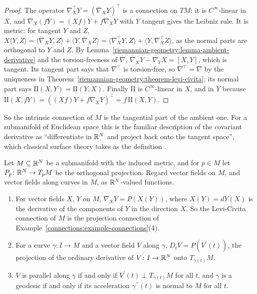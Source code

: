 \begin{proof}
The operator $\nabla^\top_XY = (\overline{\nabla}_XY)^\top$ is a connection on $TM$: it is $C^\infty$-linear in $X$, and
$\overline{\nabla}_X(fY) = (Xf)Y + f\overline{\nabla}_XY$ with $Y$ tangent gives the Leibniz rule. It is metric: for tangent $Y$ and $Z$,
$X\langle Y, Z\rangle = \langle\overline{\nabla}_XY, Z\rangle + \langle Y, \overline{\nabla}_XZ\rangle = \langle\nabla^\top_XY, Z\rangle + \langle Y, \nabla^\top_XZ\rangle$, as the normal parts are orthogonal to
$Y$ and $Z$. By Lemma~\ref{riemannian-geometry:lemma-ambient-derivative} and the torsion-freeness of $\overline{\nabla}$,
$\overline{\nabla}_XY - \overline{\nabla}_YX = [X, Y]$, which is tangent. Its tangent part says that $\nabla^\top$ is torsion-free, so $\nabla^\top = \nabla$ by the uniqueness in
Theorem~\ref{riemannian-geometry:theorem-levi-civita}; its normal part says $\mathrm{II}(X, Y) = \mathrm{II}(Y, X)$. Finally $\mathrm{II}$ is $C^\infty$-linear in $X$, and in $Y$
because $\mathrm{II}(X, fY) = ((Xf)Y + f\overline{\nabla}_XY)^\perp = f\,\mathrm{II}(X, Y)$.
\end{proof}

So the intrinsic connection of $M$ is the tangential part of the ambient one. For a submanifold of Euclidean space this is the familiar description of the covariant derivative as
``differentiate in $\mathbb{R}^N$ and project back onto the tangent space'', which classical surface theory takes as the definition \cite[Chapter 4]{do-carmo-curves-surfaces}.

\begin{corollary}\label{riemannian-geometry:corollary-tangential-projection}
Let $M \subseteq \mathbb{R}^N$ be a submanifold with the induced metric, and for $p \in M$ let $P_p \colon \mathbb{R}^N \to T_pM$ be the orthogonal projection. Regard vector fields on $M$, and vector fields along
curves in $M$, as $\mathbb{R}^N$-valued functions.
\begin{enumerate}
\item For vector fields $X$, $Y$ on $M$, $\nabla_XY = P(X(Y))$, where $X(Y) = dY(X)$ is the derivative of the components of $Y$ in the direction $X$. So the Levi-Civita connection of $M$ is the
projection connection of Example~\ref{connections:example-connections}(4).
\item For a curve $\gamma \colon I \to M$ and a vector field $V$ along $\gamma$, $D_tV = P(V^{\prime}(t))$, the projection of the ordinary derivative of $V \colon I \to \mathbb{R}^N$ onto $T_{\gamma(t)}M$.
\item $V$ is parallel along $\gamma$ if and only if $V^{\prime}(t) \perp T_{\gamma(t)}M$ for all $t$, and $\gamma$ is a geodesic if and only if its acceleration $\gamma^{\prime\prime}(t)$ is normal to $M$ for all $t$.
\end{enumerate}
\end{corollary}

